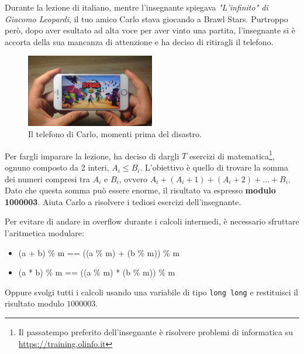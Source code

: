 \usepackage{xcolor}
\usepackage{afterpage}
\usepackage{pifont,mdframed}
\usepackage[bottom]{footmisc}
\usepackage{minted}


\newcommand{\inputfile}{\texttt{stdin}}
\newcommand{\outputfile}{\texttt{stdout}}
\makeatletter
\renewcommand{\this@inputfilename}{\texttt{stdin}}
\renewcommand{\this@outputfilename}{\texttt{stdout}}
\makeatother


Durante la lezione di italiano, mentre l'insegnante spiegava \textit{"L'infinito" di Giacomo Leopardi}, il tuo amico Carlo stava giocando a Brawl Stars.
Purtroppo però, dopo aver esultato ad alta voce per aver vinto una partita, l'insegnante si è accorta della sua mancanza di attenzione e
ha deciso di ritiragli il telefono.

\begin{figure}[h]
    \centering
    \includegraphics[width=0.5\textwidth]{brawl.jpg}
    \caption{Il telefono di Carlo, momenti prima del disastro. }
\end{figure}

Per fargli imparare la lezione, ha deciso di dargli $T$ esercizi di matematica\footnote{Il passatempo preferito dell'insegnante è risolvere problemi di informatica su \url{https://training.olinfo.it}},
ognuno composto da 2 interi, $A_i \leq B_i$. L'obiettivo è quello di trovare la somma dei numeri compresi tra $A_i$ e $B_i$, ovvero
$A_i + (A_i + 1) + (A_i+2) + \dots + B_i$. Dato che questa somma può essere enorme, il risultato va espresso \textbf{modulo 1000003}. Aiuta Carlo a risolvere i tediosi esercizi dell'insegnante.

\begin{danger}
    Per evitare di andare in overflow durante i calcoli intermedi, è necessario sfruttare l'aritmetica
    modulare:
    \begin{itemize}
        \item (a + b) \% m == ((a \% m) + (b \% m)) \% m
        \item (a * b) \% m == ((a \% m) * (b \% m)) \% m
    \end{itemize}

    Oppure svolgi tutti i calcoli usando una variabile di tipo \texttt{long long} e restituisci il risultato modulo $1000003$.
\end{danger}

